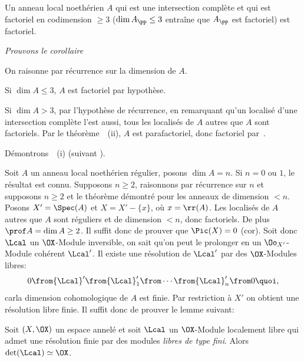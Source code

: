 \begin{corollaire} Un anneau local noeth\'erien $A$ qui est une intersection compl\`ete et qui est factoriel en codimension $\geq 3$ (\ie $\dim A_{{\pp}}\leq 3$ entra\^ine que $A_{{\pp}}$ est factoriel) est factoriel.
\end{corollaire}

\emph{Prouvons le corollaire}

On raisonne par r\'ecurrence sur la dimension de $A$.

Si $\dim A\leq 3$, $A$ est factoriel par hypoth\`ese.

Si $\dim A>3$, par l'hypoth\`ese de r\'ecurrence, en remarquant qu'un localis\'e d'une intersection compl\`ete l'est aussi, tous les localis\'es de $A$ autres que $A$ sont factoriels. Par le th\'eor\`eme~~(ii), $A$ est parafactoriel, donc factoriel par~.

D\'emontrons~~(i) (suivant ).

Soit $A$ un anneau local noeth\'erien r\'egulier, posons $\dim A=n$. Si $n=0$ ou $1$, le r\'esultat est connu. Supposons $n\geq 2$, raisonnons par r\'ecurrence sur $n$ et supposons $n\geq 2$ et le th\'eor\`eme d\'emontr\'e pour les anneaux de dimension $<n$. Posons $X'=\Spec(A)$ et $X=X'-\{x\}$, o\`u $x=\rr(A)$. Les localis\'es de $A$ autres que $A$ sont r\'eguliers et de dimension $<n$, donc factoriels. De plus $\prof A = \dim A\geq 2$. Il suffit donc de prouver que $\Pic(X)=0$ (cor\ptbl{}). Soit donc ${\Lcal}$ un $\OX$-Module inversible, on sait qu'on peut le prolonger en un $\Oo_{X'}$-Module coh\'erent ${\Lcal}'$. Il existe une r\'esolution de ${\Lcal}'$ par des $\OX$-Modules libres:
\[
0\from {\Lcal}'\from {\Lcal}'_1\from\cdots\from{\Lcal}'_n\from 0{\quoi},
\]
car\pageoriginale la dimension cohomologique de $A$ est finie. Par restriction \`a $X'$ on obtient une r\'esolution libre finie. Il suffit donc de prouver le lemme suivant:

\begin{lemme} \label{XI.3.15} Soit $(X, \OX)$ un espace annel\'e et soit ${\Lcal}$ un $\OX$-Module localement libre qui admet une r\'esolution finie par des modules \emph{libres de type fini}. Alors $\det({\Lcal}) \simeq \OX$.
\end{lemme}

